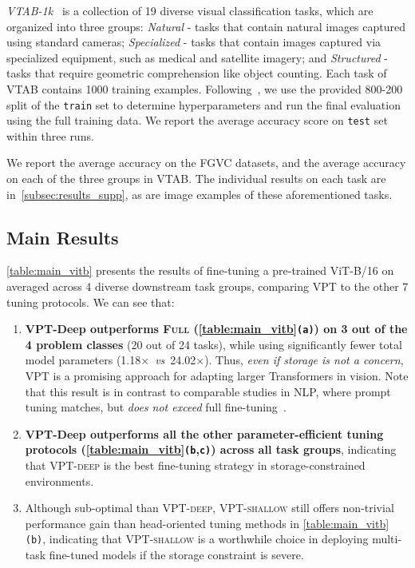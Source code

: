 \textit{VTAB-1k}~\cite{zhai2019vtab} is a collection of 19 diverse visual classification tasks, which are organized into three groups: 
\textit{Natural} - tasks that contain natural images captured using standard cameras;
\textit{Specialized} - tasks that contain images captured via specialized equipment, such as medical and satellite imagery; and \textit{Structured} - tasks that require geometric comprehension like object counting. Each task of VTAB contains 1000 training examples. Following~\cite{zhai2019vtab}, we use the provided 800-200 split of the {\small\texttt{train}} set to determine hyperparameters and run the final evaluation using the full training data. We report the average accuracy score on {\small\texttt{test}} set within three runs.

We report the average accuracy on the FGVC datasets, and the average accuracy on each of the three groups in VTAB. The individual results on each task are in~\ref{subsec:results_supp}, as are image examples of these aforementioned tasks.

\subsection{Main Results}
\label{subsec:exp_results}

\ref{table:main_vitb} presents the results of fine-tuning a pre-trained ViT-B/16 on averaged across 4 diverse downstream task groups, comparing VPT to the other 7 tuning protocols. We can see that:

\begin{enumerate}[nosep, leftmargin=5mm]
\item \textbf{VPT-Deep outperforms \textsc{Full} (\ref{table:main_vitb}\texttt{(a)}) on 3 out of the 4 problem classes} (20 out of 24 tasks), while using significantly fewer total model parameters (1.18$\times$~\emph{vs}\onedot~24.02$\times$).
Thus, \emph{even if storage is not a concern},  \textsc{VPT} is a promising approach for adapting larger Transformers in vision. Note that this result is in contrast to comparable studies in NLP, where prompt tuning matches, but \emph{does not exceed} full fine-tuning~\cite{lester-etal-2021-power}. 

\item \textbf{VPT-Deep outperforms all the other parameter-efficient tuning protocols (\ref{table:main_vitb}\texttt{(b},\texttt{c)}) across all task groups}, indicating that \textsc{VPT}-\textsc{deep} is the best fine-tuning strategy in storage-constrained environments.

\item Although sub-optimal than \textsc{VPT}-\textsc{deep}, \textsc{VPT}-\textsc{shallow} still offers non-trivial performance gain than head-oriented tuning methods in \ref{table:main_vitb}\texttt{(b)}, indicating that \textsc{VPT}-\textsc{shallow} is a worthwhile choice in deploying multi-task fine-tuned models if the storage constraint is severe.
\end{enumerate}

